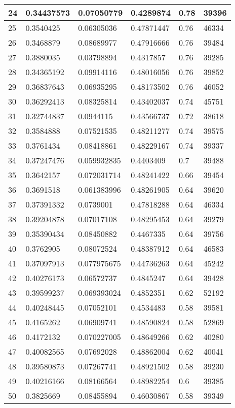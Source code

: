 \begin{longtable}{|l|l|l|l|l|l|}
24 & 0.34437573 & 0.07050779 & 0.4289874 & 0.78 & 39396 \\ \hline 
25 & 0.3540425 & 0.06305036 & 0.47871447 & 0.76 & 46334 \\ \hline 
26 & 0.3468879 & 0.08689977 & 0.47916666 & 0.76 & 39484 \\ \hline 
27 & 0.3880035 & 0.03798894 & 0.4317857 & 0.76 & 39285 \\ \hline 
28 & 0.34365192 & 0.09914116 & 0.48016056 & 0.76 & 39852 \\ \hline 
29 & 0.36837643 & 0.06935295 & 0.48173502 & 0.76 & 46052 \\ \hline 
30 & 0.36292413 & 0.08325814 & 0.43402037 & 0.74 & 45751 \\ \hline 
31 & 0.32744837 & 0.0944115 & 0.43566737 & 0.72 & 38618 \\ \hline 
32 & 0.3584888 & 0.07521535 & 0.48211277 & 0.74 & 39575 \\ \hline 
33 & 0.3761434 & 0.08418861 & 0.48229167 & 0.74 & 39337 \\ \hline 
34 & 0.37247476 & 0.059932835 & 0.4403409 & 0.7 & 39488 \\ \hline 
35 & 0.3642157 & 0.072031714 & 0.48241422 & 0.66 & 39454 \\ \hline 
36 & 0.3691518 & 0.061383996 & 0.48261905 & 0.64 & 39620 \\ \hline 
37 & 0.37391332 & 0.0739001 & 0.47818288 & 0.64 & 46334 \\ \hline 
38 & 0.39204878 & 0.07017108 & 0.48295453 & 0.64 & 39279 \\ \hline 
39 & 0.35390434 & 0.08450882 & 0.4467335 & 0.64 & 39756 \\ \hline 
40 & 0.3762905 & 0.08072524 & 0.48387912 & 0.64 & 46583 \\ \hline 
41 & 0.37097913 & 0.077975675 & 0.44736263 & 0.64 & 45242 \\ \hline 
42 & 0.40276173 & 0.06572737 & 0.4845247 & 0.64 & 39428 \\ \hline 
43 & 0.39599237 & 0.069393024 & 0.4852351 & 0.62 & 52192 \\ \hline 
44 & 0.40248445 & 0.07052101 & 0.4534483 & 0.58 & 39581 \\ \hline 
45 & 0.4165262 & 0.06909741 & 0.48590824 & 0.58 & 52869 \\ \hline 
46 & 0.4172132 & 0.070227005 & 0.48649266 & 0.62 & 40280 \\ \hline 
47 & 0.40082565 & 0.07692028 & 0.48862004 & 0.62 & 40041 \\ \hline 
48 & 0.39580873 & 0.07267741 & 0.48921502 & 0.58 & 39230 \\ \hline 
49 & 0.40216166 & 0.08166564 & 0.48982254 & 0.6 & 39385 \\ \hline 
50 & 0.3825669 & 0.08455894 & 0.46030867 & 0.58 & 39349 \\ \hline 
\end{longtable}